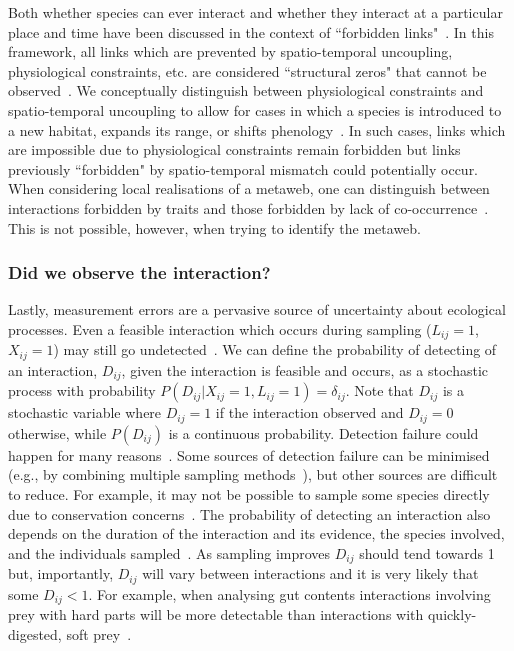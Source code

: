 \documentclass[12pt]{article}
\begin{document}
\begin{spacing}{1.5}
            Both whether species can ever interact and whether they interact at a particular place and time have been discussed in the context of ``forbidden links"~\citep{Jordano2016}. In this framework, all links which are prevented by spatio-temporal uncoupling, physiological constraints, etc. are considered ``structural zeros" that cannot be observed~\citep{Jordano1987,Jordano2016}. We conceptually distinguish between physiological constraints and spatio-temporal uncoupling to allow for cases in which a species is introduced to a new habitat, expands its range, or shifts phenology~\citep{Gravel2013}. In such cases, links which are impossible due to physiological constraints remain forbidden but links previously ``forbidden" by spatio-temporal mismatch could potentially occur. When considering local realisations of a metaweb, one can distinguish between interactions forbidden by traits and those forbidden by lack of co-occurrence~\citep{Gravel2018}. This is not possible, however, when trying to identify the metaweb.


        \subsubsection*{Did we observe the interaction?} 

          Lastly, measurement errors are a pervasive source of uncertainty about ecological processes. Even a feasible interaction which occurs during sampling ($L_{ij}=1$, $X_{ij}=1$) may still go undetected~\citep{Jordano2016,Weinstein2017}. We can define the probability of detecting of an interaction, $D_{ij}$, given the interaction is feasible and occurs, as a stochastic process with  probability $P(D_{ij}|X_{ij}=1,L_{ij}=1)=\delta_{ij}$. Note that $D_{ij}$ is a stochastic variable where $D_{ij}=1$ if the interaction observed and $D_{ij}=0$ otherwise, while $P(D_{ij})$ is a continuous probability. Detection failure could happen for many reasons~\citep{Wirta2014}. Some sources of detection failure can be minimised (e.g., by combining multiple sampling methods~\citep{Wirta2014,Jordano2016}), but other sources are difficult to reduce. For example, it may not be possible to sample some species directly due to conservation concerns~\citep{Lagrue2015}. The probability of detecting an interaction also depends on the duration of the interaction and its evidence, the species involved, and the individuals sampled~\citep{Wells2013,Lagrue2015,Cirtwill2016,Weinstein2017}. As sampling improves $D_{ij}$ should tend towards 1 but, importantly, $D_{ij}$ will vary between interactions and it is very likely that some $D_{ij}<1$. For example, when analysing gut contents interactions involving prey with hard parts will be more detectable than interactions with quickly-digested, soft prey~\citep{Alberdi2018}.



\end{spacing}
\end{document}
